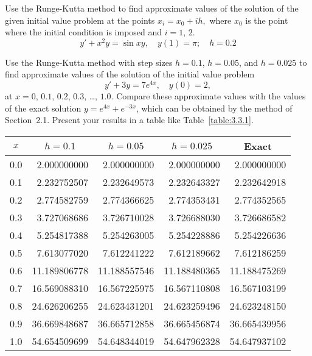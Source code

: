 \documentclass{ximera}
\begin{document}
\begin{problem}\label{exer:3.3.5} Use the Runge-Kutta method to
find approximate values of the solution of the given initial value
problem at the points $x_i=x_0+ih,$ where $x_0$ is the point where
the initial condition is imposed and $i=1$, $2$.
$$y'+x^2y=\sin xy,\quad y(1)=\pi;\quad h=0.2$$
\end{problem}

\begin{problem}\label{exer:3.3.6}
Use  the Runge-Kutta method with step sizes $h=0.1$, $h=0.05$, and
$h=0.025$ to
find approximate values of the solution of the initial value problem
$$
y'+3y=7e^{4x},\quad y(0)=2,
$$
at $x=0$, $0.1$, $0.2$, $0.3$, \dots, $1.0$. Compare these approximate
values with the
values of the exact solution $y=e^{4x}+e^{-3x}$, which can be obtained
by the method of Section~2.1. Present your results in a table
like Table~\ref{table:3.3.1}.

\begin{solution}
    {\small
\begin{tabular}{|c|r|r|r|r|}\hline
\multicolumn{1}{|c|}{$x$}&
\multicolumn{1}{|c|}{$h=0.1$}&
\multicolumn{1}{|c|}{$h=0.05$}&
\multicolumn{1}{|c|}{$h=0.025$}&
\multicolumn{1}{|c|}{Exact}\\ \hline
0.0 &   2.000000000 &  2.000000000 &  2.000000000 &   2.000000000 \\
0.1 &   2.232752507 &  2.232649573 &  2.232643327 &   2.232642918 \\
0.2 &   2.774582759 &  2.774366625 &  2.774353431 &   2.774352565 \\
0.3 &   3.727068686 &  3.726710028 &  3.726688030 &   3.726686582 \\
0.4 &   5.254817388 &  5.254263005 &  5.254228886 &   5.254226636 \\
0.5 &   7.613077020 &  7.612241222 &  7.612189662 &   7.612186259 \\
0.6 &  11.189806778 & 11.188557546 & 11.188480365 &  11.188475269 \\
0.7 &  16.569088310 & 16.567225975 & 16.567110808 &  16.567103199 \\
0.8 &  24.626206255 & 24.623431201 & 24.623259496 &  24.623248150 \\
0.9 &  36.669848687 & 36.665712858 & 36.665456874 &  36.665439956 \\
1.0 &  54.654509699 & 54.648344019 & 54.647962328 &  54.647937102 \\
\hline
\end{tabular}}
\end{solution}
\end{problem}
\end{document}
